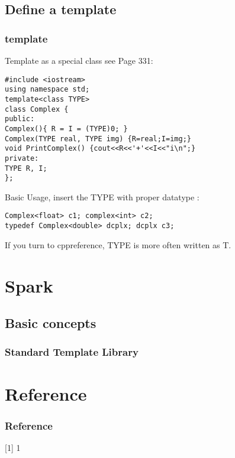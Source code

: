 \documentclass{beamer}
\begin{document}
\subsection{Define a template}

\begin{frame}[fragile]
	\frametitle{template}
	Template as a special class see Page 331:
	\begin{verbatim}
#include <iostream>
using namespace std;
template<class TYPE>
class Complex {
public:
Complex(){ R = I = (TYPE)0; }
Complex(TYPE real, TYPE img) {R=real;I=img;}
void PrintComplex() {cout<<R<<'+'<<I<<"i\n";}
private:
TYPE R, I;
};
\end{verbatim}
	Basic Usage, insert the TYPE with proper datatype :
	\begin{verbatim}
Complex<float> c1; complex<int> c2;
typedef Complex<double> dcplx; dcplx c3;
\end{verbatim}
If you turn to cppreference, TYPE is more often written as T.
\end{frame}




\section{Spark}
\begin{frame}
\end{frame}

\subsection{Basic concepts}
\begin{frame}
	\frametitle{Standard Template Library}
\end{frame}

\section{Reference}
\begin{frame}
	\frametitle{Reference}
	\begin{thebibliography}{}
		[1] 1
	\end{thebibliography}
\end{frame}
\end{document}
